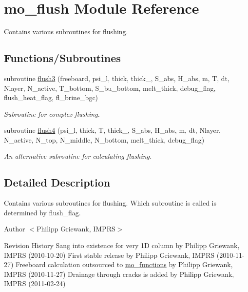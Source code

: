 \hypertarget{namespacemo__flush}{
\section{mo\_\-flush Module Reference}
\label{namespacemo__flush}
}


Contains various subroutines for flushing.  


\subsection*{Functions/Subroutines}
\begin{DoxyCompactItemize}
\item 
subroutine \hyperlink{namespacemo__flush_a405b14313a6162816fc9f7cc30501b2e}{flush3} (freeboard, psi\_\-l, thick, thick\_, S\_\-abs, H\_\-abs, m, T, dt, Nlayer, N\_\-active, T\_\-bottom, S\_\-bu\_\-bottom, melt\_\-thick, debug\_\-flag, flush\_\-heat\_\-flag, fl\_\-brine\_\-bgc)
\begin{DoxyCompactList}\small\item\em Subroutine for complex flushing. \item\end{DoxyCompactList}\item 
subroutine \hyperlink{namespacemo__flush_aa1fdebea288d239b56f2db40538991f3}{flush4} (psi\_\-l, thick, T, thick\_, S\_\-abs, H\_\-abs, m, dt, Nlayer, N\_\-active, N\_\-top, N\_\-middle, N\_\-bottom, melt\_\-thick, debug\_\-flag)
\begin{DoxyCompactList}\small\item\em An alternative subroutine for calculating flushing. \item\end{DoxyCompactList}\end{DoxyCompactItemize}


\subsection{Detailed Description}
Contains various subroutines for flushing. Which subroutine is called is determined by flush\_\-flag.

\begin{DoxyAuthor}{Author}
$<$Philipp Griewank, IMPRS$>$
\end{DoxyAuthor}
\begin{DoxyParagraph}{Revision History}
Sang into existence for very 1D column by Philipp Griewank, IMPRS (2010-\/10-\/20) First stable release by Philipp Griewank, IMPRS (2010-\/11-\/27) Freeboard calculation outsourced to \hyperlink{namespacemo__functions}{mo\_\-functions} by Philipp Griewank, IMPRS (2010-\/11-\/27) Drainage through cracks is added by Philipp Griewank, IMPRS (2011-\/02-\/24) 
\end{DoxyParagraph}


